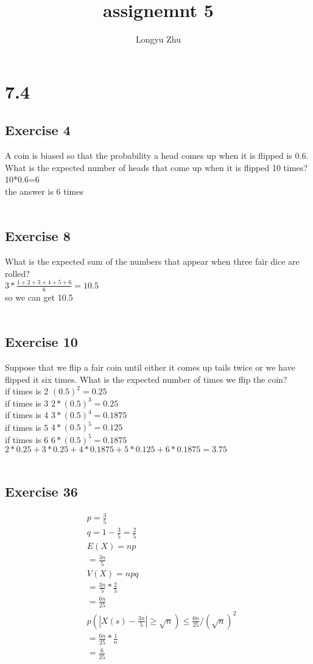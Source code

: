 \documentclass[12pt]{article}
\title{assignemnt 5}
\author{Longyu Zhu}
\begin{document}
\section*{7.4}
\subsection*{Exercise 4}
A coin is biased so that the probability a head comes up when it is flipped is 0.6. What is the expected number of heads that come up when it is flipped 10 times?\\
10*0.6=6\\
the answer is 6 times\\
\\
\subsection*{Exercise 8}
What is the expected sum of the numbers that appear when three fair dice are rolled?\\
$3*\frac{1+2+3+4+5+6}{6}=10.5$\\
so we can get 10.5\\
\\
\subsection*{Exercise 10}
Suppose that we flip a fair coin until either it comes up tails twice or we have flipped it six times. What is the expected number of times we flip the coin?\\
if times is 2 $(0.5)^2=0.25$\\
if times is 3 $2*(0.5)^3=0.25$\\
if times is 4 $3*(0.5)^4=0.1875$\\
if times is 5 $4*(0.5)^5=0.125$\\
if times is 6 $6*(0.5)^5=0.1875$\\
$2*0.25+3*0.25+4*0.1875+5*0.125+6*0.1875=3.75$\\
\\
\subsection*{Exercise 36}
\begin{equation}\nonumber
    \begin{split}
&p=\frac{3}{5}\\
&q=1-\frac{3}{5}=\frac{2}{5}\\
&E(X)=np\\
&=\frac{3n}{5}\\
&V(X)=npq\\
&=\frac{3n}{5}*\frac{2}{5}\\
&=\frac{6n}{25}\\
&p(|X(s)-\frac{3n}{5}|\geq \sqrt{n})\leq \frac{6n}{25}/(\sqrt{n})^2\\
&=\frac{6n}{25}*\frac{1}{n}\\
&=\frac{6}{25}
    \end{split}
\end{equation}
\\
\end{document}
